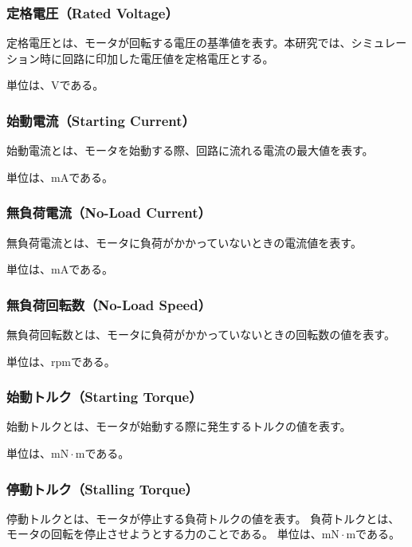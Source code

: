 \subsubsection{定格電圧（Rated Voltage）}\label{sub:sub:dennatu}
定格電圧とは、モータが回転する電圧の基準値を表す。本研究では、シミュレーション時に回路に印加した電圧値を定格電圧とする。

単位は、$\mathrm{V}$である。
\subsubsection{始動電流（Starting Current）}\label{sub:sub:sidouden}
始動電流とは、モータを始動する際、回路に流れる電流の最大値を表す。

単位は、$\mathrm{mA}$である。

\subsubsection{無負荷電流（No-Load Current）}
無負荷電流とは、モータに負荷がかかっていないときの電流値を表す。

単位は、$\mathrm{mA}$である。

\subsubsection{無負荷回転数（No-Load Speed）}
無負荷回転数とは、モータに負荷がかかっていないときの回転数の値を表す。

単位は、$\mathrm{rpm}$である。

\subsubsection{始動トルク（Starting Torque）}
始動トルクとは、モータが始動する際に発生するトルクの値を表す。

単位は、$\mathrm{mN \cdot m}$である。


\subsubsection{停動トルク（Stalling Torque）}\label{sub:sub:teidoutoruku}
停動トルクとは、モータが停止する負荷トルクの値を表す。
負荷トルクとは、モータの回転を停止させようとする力のことである。
単位は、$\mathrm{mN \cdot m}$である。
